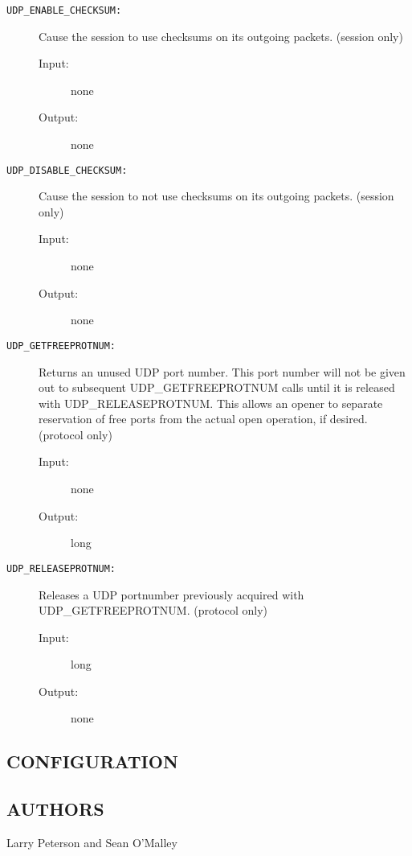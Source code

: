 \begin{description}

\item[{\tt UDP\_ENABLE\_CHECKSUM:}]
Cause the session to use checksums on its outgoing packets.  
(session only)
\begin{description}
\item[{\rm Input:}] none
\item[{\rm Output:}] none
\end{description}

\item[{\tt UDP\_DISABLE\_CHECKSUM:}]
Cause the session to not use checksums on its outgoing packets.
(session only) 
\begin{description}
\item[{\rm Input:}] none
\item[{\rm Output:}] none
\end{description}


\item[{\tt UDP\_GETFREEPROTNUM:}]
Returns an unused UDP port number.  This port number will not be given
out to subsequent UDP\_GETFREEPROTNUM calls until it is released with
UDP\_RELEASEPROTNUM.  This allows an opener to separate reservation of
free ports from the actual open operation, if desired.
(protocol only) 
\begin{description}
\item[{\rm Input:}] none
\item[{\rm Output:}] long
\end{description}


\item[{\tt UDP\_RELEASEPROTNUM:}]
Releases a UDP portnumber previously acquired with UDP\_GETFREEPROTNUM.
(protocol only)
\begin{description}
\item[{\rm Input:}] long
\item[{\rm Output:}] none
\end{description}



\end{description}

\subsection*{CONFIGURATION}


\subsection*{AUTHORS}

\noindent Larry Peterson and Sean O'Malley
